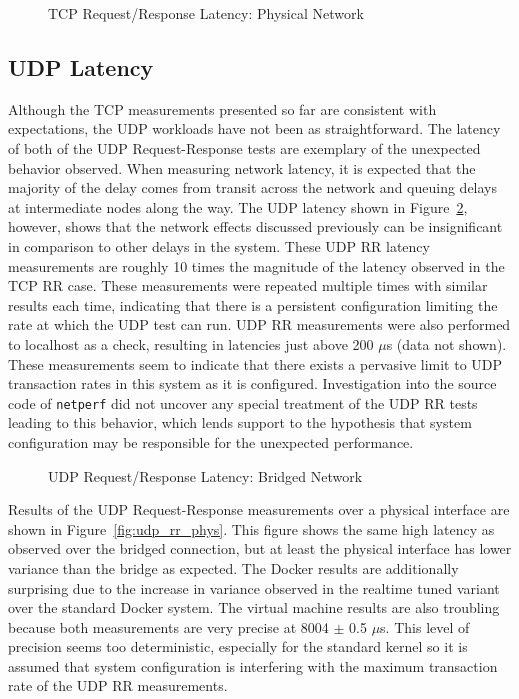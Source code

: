 \begin{figure}
    \centering
    \def\svgwidth{\columnwidth}
    
    \caption{TCP Request/Response Latency: Physical Network}
    \label{fig:tcp_rr_phys}
\end{figure}


\subsection{UDP Latency} %
\label{sub:udplatency}

Although the TCP measurements presented so far are consistent with expectations, the UDP workloads have not been as straightforward.
The latency of both of the UDP Request-Response tests are exemplary of the unexpected behavior observed.
When measuring network latency, it is expected that the majority of the delay comes from transit across the network and queuing delays at intermediate nodes along the way.  
The UDP latency shown in Figure~\ref{fig:udp_rr_bridge}, however, shows that the network effects discussed previously can be insignificant in comparison to other delays in the system.
These UDP RR latency measurements are roughly 10 times the magnitude of the latency observed in the TCP RR case.
These measurements were repeated multiple times with similar results each time, indicating that there is a persistent configuration limiting the rate at which the UDP test can run.
UDP RR measurements were also performed to localhost as a check, resulting in latencies just above 200 $\mu$s (data not shown).  
These measurements seem to indicate that there exists a pervasive limit to UDP transaction rates in this system as it is configured.  
Investigation into the source code of \texttt{netperf} did not uncover any special treatment of the UDP RR tests leading to this behavior, which lends support to the hypothesis that system configuration may be responsible for the unexpected performance.

\begin{figure}
    \centering
    \def\svgwidth{\columnwidth}
    
    \caption{UDP Request/Response Latency: Bridged Network}
    \label{fig:udp_rr_bridge}
\end{figure}

Results of the UDP Request-Response measurements over a physical interface are shown in Figure~\ref{fig:udp_rr_phys}.  
This figure shows the same high latency as observed over the bridged connection, but at least the physical interface has lower variance than the bridge as expected.
The Docker results are additionally surprising due to the increase in variance observed in the realtime tuned variant over the standard Docker system.
The virtual machine results are also troubling because both measurements are very precise at 8004 $\pm$ 0.5 $\mu$s.  
This level of precision seems too deterministic, especially for the standard kernel so it is assumed that system configuration is interfering with the maximum transaction rate of the UDP RR measurements.

